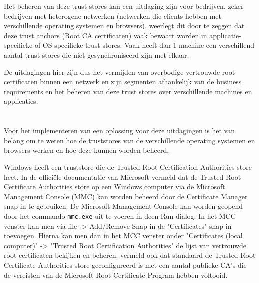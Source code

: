 Het beheren van deze trust stores kan een uitdaging zijn voor bedrijven, zeker bedrijven met heterogene netwerken (netwerken die clients hebben met verschillende operating systemen en browsers).
\textcite{rfc6024} weerlegt dit door te zeggen dat deze trust anchors (Root CA certificaten) vaak bewaart worden in applicatie-specifieke of OS-specifieke trust stores.
Vaak heeft dan 1 machine een verschillend aantal trust stores die niet gesynchroniseerd zijn met elkaar. \break

De uitdagingen hier zijn dus het vermijden van overbodige vertrouwde root certificaten binnen een netwerk en zijn segmenten afhankelijk van de business requirements en het beheren van deze trust stores over verschillende machines en applicaties. 

\section{}%
\label{sec:Verschillende truststores}

Voor het implementeren van een oplossing voor deze uitdagingen is het van belang om te weten hoe de truststores van de verschillende operating systemen en browsers werken en hoe deze kunnen worden beheerd. \break

Windows heeft een truststore die de Trusted Root Certification Authorities store heet.
In de officiële documentatie van Microsoft vermeld \textcite{MStruststore} dat de Trusted Root Certificate Authorities store op een Windows computer via de Microsoft Management Console (MMC) kan worden beheerd door de Certificate Manager snap-in te gebruiken.
De Microsoft Management Console kan worden geopend door het commando \texttt{mmc.exe} uit te voeren in deen Run dialog. In het MCC venster kan men via file -> Add/Remove Snap-in de "Certificates" snap-in toevoegen.
Hierna kan men dan in het MCC venster onder "Certificates (local computer)" -> "Trusted Root Certification Authorities" de lijst van vertrouwde root certificaten bekijken en beheren.
\textcite{MStruststore} vermeld ook dat standaard de Trusted Root Certificate Authorities store geconfigureerd is met een aantal publieke CA's die de vereisten van de Microsoft Root Certificate Program hebben voltooid. \break

